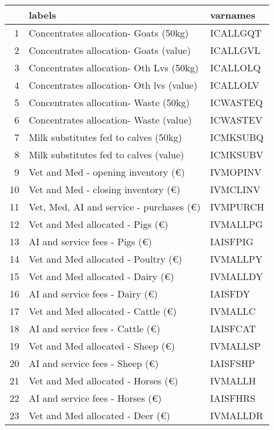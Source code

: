 \documentclass{article}\usepackage{graphicx, color}
\begin{document}
\begin{flushleft}
\newpage
\begin{table}[ht]
\begin{center}
\begin{tabular}{rll}
  \hline
 & labels & varnames \\ 
  \hline
1 & Concentrates allocation- Goats (50kg) & ICALLGQT \\ 
  2 & Concentrates allocation- Goats (value) & ICALLGVL \\ 
  3 & Concentrates allocation- Oth Lvs (50kg) & ICALLOLQ \\ 
  4 & Concentrates allocation- Oth lvs (value) & ICALLOLV \\ 
  5 & Concentrates allocation- Waste (50kg) & ICWASTEQ \\ 
  6 & Concentrates allocation- Waste (value) & ICWASTEV \\ 
  7 & Milk substitutes fed to calves (50kg) & ICMKSUBQ \\ 
  8 & Milk substitutes fed to calves (value) & ICMKSUBV \\ 
  9 & Vet and Med - opening inventory (€) & IVMOPINV \\ 
  10 & Vet and Med - closing inventory (€) & IVMCLINV \\ 
  11 & Vet, Med, AI and service - purchases (€) & IVMPURCH \\ 
  12 & Vet and Med allocated - Pigs    (€) & IVMALLPG \\ 
  13 & AI and service fees - Pigs      (€) & IAISFPIG \\ 
  14 & Vet and Med allocated - Poultry (€) & IVMALLPY \\ 
  15 & Vet and Med allocated - Dairy   (€) & IVMALLDY \\ 
  16 & AI and service fees - Dairy     (€) & IAISFDY \\ 
  17 & Vet and Med allocated - Cattle  (€) & IVMALLC \\ 
  18 & AI and service fees - Cattle    (€) & IAISFCAT \\ 
  19 & Vet and Med allocated - Sheep   (€) & IVMALLSP \\ 
  20 & AI and service fees - Sheep     (€) & IAISFSHP \\ 
  21 & Vet and Med allocated - Horses  (€) & IVMALLH \\ 
  22 & AI and service fees - Horses    (€) & IAISFHRS \\ 
  23 & Vet and Med allocated - Deer    (€) & IVMALLDR \\ 

\end{tabular}
\end{center}
\end{table}
\end{flushleft}
\end{document}
